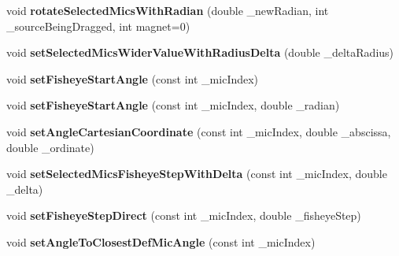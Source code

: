 \begin{DoxyCompactItemize}
\item 
\hypertarget{class_ambisonic_virtual_mic_u_i_manager_a4a4867eb6a592f7608eaa75898009a24}{void {\bfseries rotate\-Selected\-Mics\-With\-Radian} (double \-\_\-new\-Radian, int \-\_\-source\-Being\-Dragged, int magnet=0)}\label{class_ambisonic_virtual_mic_u_i_manager_a4a4867eb6a592f7608eaa75898009a24}

\item 
\hypertarget{class_ambisonic_virtual_mic_u_i_manager_a702f8d52ed9804bc389f214e33d76612}{void {\bfseries set\-Selected\-Mics\-Wider\-Value\-With\-Radius\-Delta} (double \-\_\-delta\-Radius)}\label{class_ambisonic_virtual_mic_u_i_manager_a702f8d52ed9804bc389f214e33d76612}

\item 
\hypertarget{class_ambisonic_virtual_mic_u_i_manager_a2cbaaf90e0bab59a7148e64e7bcbe14c}{void {\bfseries set\-Fisheye\-Start\-Angle} (const int \-\_\-mic\-Index)}\label{class_ambisonic_virtual_mic_u_i_manager_a2cbaaf90e0bab59a7148e64e7bcbe14c}

\item 
\hypertarget{class_ambisonic_virtual_mic_u_i_manager_ad849edb54f33ff92a1a916ea53ce96c5}{void {\bfseries set\-Fisheye\-Start\-Angle} (const int \-\_\-mic\-Index, double \-\_\-radian)}\label{class_ambisonic_virtual_mic_u_i_manager_ad849edb54f33ff92a1a916ea53ce96c5}

\item 
\hypertarget{class_ambisonic_virtual_mic_u_i_manager_a31441cc38913a5818797ce56dfa1df85}{void {\bfseries set\-Angle\-Cartesian\-Coordinate} (const int \-\_\-mic\-Index, double \-\_\-abscissa, double \-\_\-ordinate)}\label{class_ambisonic_virtual_mic_u_i_manager_a31441cc38913a5818797ce56dfa1df85}

\item 
\hypertarget{class_ambisonic_virtual_mic_u_i_manager_a0232ddc6152f241d0d4d9a4ff38ce583}{void {\bfseries set\-Selected\-Mics\-Fisheye\-Step\-With\-Delta} (const int \-\_\-mic\-Index, double \-\_\-delta)}\label{class_ambisonic_virtual_mic_u_i_manager_a0232ddc6152f241d0d4d9a4ff38ce583}

\item 
\hypertarget{class_ambisonic_virtual_mic_u_i_manager_abfebe205ba0bf83eb438beef8fcdd219}{void {\bfseries set\-Fisheye\-Step\-Direct} (const int \-\_\-mic\-Index, double \-\_\-fisheye\-Step)}\label{class_ambisonic_virtual_mic_u_i_manager_abfebe205ba0bf83eb438beef8fcdd219}

\item 
\hypertarget{class_ambisonic_virtual_mic_u_i_manager_a51e54d90f3369ed9234e79fa18317c37}{void {\bfseries set\-Angle\-To\-Closest\-Def\-Mic\-Angle} (const int \-\_\-mic\-Index)}\label{class_ambisonic_virtual_mic_u_i_manager_a51e54d90f3369ed9234e79fa18317c37}


\end{DoxyCompactItemize}
